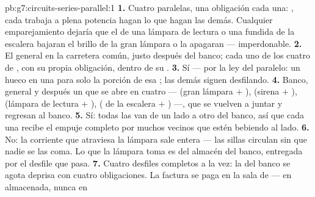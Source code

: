 \begin{solution}{pb:g7:circuits-series-parallel:1}
\textbf{1.} Cuatro  paralelas, una obligación cada una:
, cada  trabaja a plena potencia hagan lo que
hagan las demás. Cualquier emparejamiento  dejaría que el
 de una lámpara de lectura o una  fundida de
la escalera bajaran el brillo de la gran lámpara o la apagaran ---
imperdonable.
\textbf{2.} El general en la carretera común, justo después del banco;
cada uno de los cuatro  de ,  con
su propia obligación, dentro de su .
\textbf{3.} Sí --- por la ley del paralelo: un hueco en una 
para solo la porción de esa ; las demás siguen desfilando.
\textbf{4.} Banco,  general y después un  que
se abre en cuatro  --- (gran lámpara $+$
), (sirena $+$ ), (lámpara de lectura
$+$ ), ( de la escalera $+$
) ---, que se vuelven a juntar y regresan al banco.
\textbf{5.} Sí: todas las  van de un lado a otro del banco,
así que cada una recibe el empuje completo por muchos vecinos que
estén bebiendo al lado.
\textbf{6.} No: la corriente que atraviesa la lámpara sale entera ---
las sillas circulan sin que nadie se las coma. Lo que la lámpara toma
es  del almacén del banco, entregada por el desfile que pasa.
\textbf{7.} Cuatro desfiles completos a la vez: la  del
banco se agota deprisa con cuatro obligaciones. La factura se paga en
la sala de  --- en  almacenada, nunca en

\end{solution}
